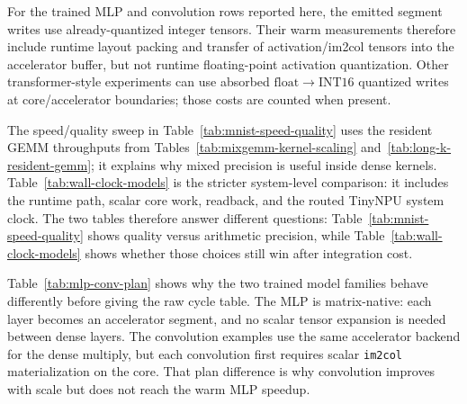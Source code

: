 \documentclass[a4paper, 12pt, titlepage]{article}
\begin{document}
For the trained MLP and convolution rows reported here, the emitted segment writes use already-quantized integer tensors. Their warm measurements therefore include runtime layout packing and transfer of activation/im2col tensors into the accelerator buffer, but not runtime floating-point activation quantization. Other transformer-style experiments can use absorbed \(\mathrm{float}\rightarrow\mathrm{INT16}\) quantized writes at core/accelerator boundaries; those costs are counted when present.

The speed/quality sweep in Table~\ref{tab:mnist-speed-quality} uses the resident GEMM throughputs from Tables~\ref{tab:mixgemm-kernel-scaling} and~\ref{tab:long-k-resident-gemm}; it explains why mixed precision is useful inside dense kernels. Table~\ref{tab:wall-clock-models} is the stricter system-level comparison: it includes the runtime path, scalar core work, readback, and the routed TinyNPU system clock. The two tables therefore answer different questions: Table~\ref{tab:mnist-speed-quality} shows quality versus arithmetic precision, while Table~\ref{tab:wall-clock-models} shows whether those choices still win after integration cost.

Table~\ref{tab:mlp-conv-plan} shows why the two trained model families behave differently before giving the raw cycle table. The MLP is matrix-native: each layer becomes an accelerator segment, and no scalar tensor expansion is needed between dense layers. The convolution examples use the same accelerator backend for the dense multiply, but each convolution first requires scalar \texttt{im2col} materialization on the core. That plan difference is why convolution improves with scale but does not reach the warm MLP speedup.
\end{document}
